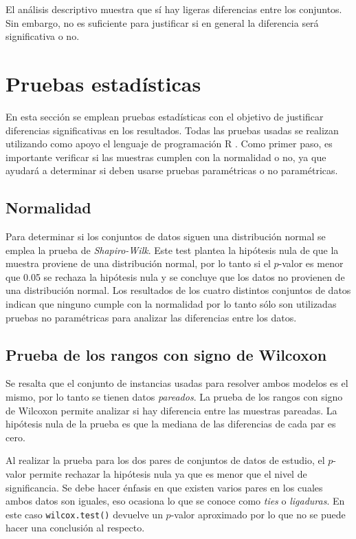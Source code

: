 \documentclass[preprint,12pt,authoryear]{elsarticle}
\begin{document}
El análisis descriptivo muestra que sí hay ligeras diferencias entre los conjuntos. Sin embargo, no es suficiente para justificar si en general la diferencia será significativa o no. 


\section{Pruebas estadísticas}
\label{pe}

En esta sección se emplean pruebas estadísticas con el objetivo de justificar diferencias significativas en los resultados. Todas las pruebas usadas se realizan utilizando como apoyo el lenguaje de programación \textsc{R} \citep{r}. Como primer paso, es importante verificar si las muestras cumplen con la normalidad o no, ya que ayudará a determinar si deben usarse pruebas paramétricas o no paramétricas. 

\subsection{Normalidad}

Para determinar si los conjuntos de datos siguen una distribución normal se emplea la prueba de {\em Shapiro-Wilk}. Este test plantea la hipótesis nula de que la muestra proviene de una distribución normal, por lo tanto si el $p$-valor es menor que 0.05 se rechaza la hipótesis nula y se concluye que los datos no provienen de una distribución normal. Los resultados de los cuatro distintos conjuntos de datos indican que ninguno cumple con la normalidad por lo tanto sólo son utilizadas pruebas no paramétricas para analizar las diferencias entre los datos.

\subsection{Prueba de los rangos con signo de Wilcoxon}

Se resalta que el conjunto de instancias usadas para resolver ambos modelos es el mismo, por lo tanto se tienen datos {\em pareados}. La prueba de los rangos con signo de Wilcoxon permite analizar si hay diferencia entre las muestras pareadas. La hipótesis nula de la prueba es que la mediana de las diferencias de cada par es cero.

Al realizar la prueba para los dos pares de conjuntos de datos de estudio, el $p$-valor permite rechazar la hipótesis nula ya que es menor que el nivel de significancia. Se debe hacer énfasis en que existen varios pares en los cuales ambos datos son iguales, eso ocasiona lo que se conoce como {\em ties} o {\em ligaduras}. En este caso \texttt{wilcox.test()} devuelve un $p$-valor aproximado por lo que no se puede hacer una conclusión al respecto.  
\end{document}
